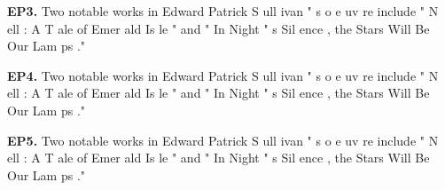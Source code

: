 \begin{mdframed}
\textbf{EP3.} \textcolor{Gray0}{Two} \textcolor{Gray0}{notable} \textcolor{Gray0}{works} \textcolor{Gray0}{in} \textcolor{Gray0}{Edward} \textcolor{Gray0}{Patrick} \textcolor{Gray0}{S} \textcolor{Gray0}{ull} \textcolor{Gray1}{ivan} \textcolor{Gray0}{"} \textcolor{Gray0}{s} \textcolor{Gray0}{o} \textcolor{Gray1}{e} \textcolor{Gray4}{uv} \textcolor{Gray5}{re} \textcolor{Gray0}{include} \textcolor{Gray0}{"} \textcolor{Gray0}{N} \textcolor{Gray2}{ell} \textcolor{Gray0}{:} \textcolor{Gray0}{A} \textcolor{Gray0}{T} \textcolor{Gray0}{ale} \textcolor{Gray0}{of} \textcolor{Gray0}{Emer} \textcolor{Gray3}{ald} \textcolor{Gray0}{Is} \textcolor{Gray8}{le} \textcolor{Gray0}{"} \textcolor{Gray1}{and} \textcolor{Gray0}{"} \textcolor{Gray0}{In} \textcolor{Gray0}{Night} \textcolor{Gray0}{"} \textcolor{Gray2}{s} \textcolor{Gray3}{Sil} \textcolor{Gray4}{ence} \textcolor{Gray1}{,} \textcolor{Gray2}{the} \textcolor{Gray2}{Stars} \textcolor{Gray3}{Will} \textcolor{Gray1}{Be} \textcolor{Gray0}{Our} \textcolor{Gray7}{Lam} \textcolor{Gray6}{ps} \textcolor{Gray0}{."} 

\textbf{EP4.} \textcolor{Gray0}{Two} \textcolor{Gray0}{notable} \textcolor{Gray0}{works} \textcolor{Gray0}{in} \textcolor{Gray0}{Edward} \textcolor{Gray0}{Patrick} \textcolor{Gray0}{S} \textcolor{Gray0}{ull} \textcolor{Gray0}{ivan} \textcolor{Gray0}{"} \textcolor{Gray0}{s} \textcolor{Gray0}{o} \textcolor{Gray0}{e} \textcolor{Gray0}{uv} \textcolor{Gray0}{re} \textcolor{Gray0}{include} \textcolor{Gray0}{"} \textcolor{Gray0}{N} \textcolor{Gray0}{ell} \textcolor{Gray0}{:} \textcolor{Gray0}{A} \textcolor{Gray0}{T} \textcolor{Gray0}{ale} \textcolor{Gray0}{of} \textcolor{Gray0}{Emer} \textcolor{Gray0}{ald} \textcolor{Gray0}{Is} \textcolor{Gray0}{le} \textcolor{Gray0}{"} \textcolor{Gray0}{and} \textcolor{Gray0}{"} \textcolor{Gray0}{In} \textcolor{Gray0}{Night} \textcolor{Gray0}{"} \textcolor{Gray0}{s} \textcolor{Gray0}{Sil} \textcolor{Gray0}{ence} \textcolor{Gray0}{,} \textcolor{Gray0}{the} \textcolor{Gray0}{Stars} \textcolor{Gray0}{Will} \textcolor{Gray0}{Be} \textcolor{Gray0}{Our} \textcolor{Gray0}{Lam} \textcolor{Gray0}{ps} \textcolor{Gray0}{."} 

\textbf{EP5.} \textcolor{Gray0}{Two} \textcolor{Gray0}{notable} \textcolor{Gray0}{works} \textcolor{Gray0}{in} \textcolor{Gray0}{Edward} \textcolor{Gray0}{Patrick} \textcolor{Gray0}{S} \textcolor{Gray0}{ull} \textcolor{Gray0}{ivan} \textcolor{Gray0}{"} \textcolor{Gray0}{s} \textcolor{Gray0}{o} \textcolor{Gray0}{e} \textcolor{Gray0}{uv} \textcolor{Gray0}{re} \textcolor{Gray0}{include} \textcolor{Gray0}{"} \textcolor{Gray0}{N} \textcolor{Gray0}{ell} \textcolor{Gray0}{:} \textcolor{Gray0}{A} \textcolor{Gray0}{T} \textcolor{Gray0}{ale} \textcolor{Gray0}{of} \textcolor{Gray0}{Emer} \textcolor{Gray0}{ald} \textcolor{Gray0}{Is} \textcolor{Gray0}{le} \textcolor{Gray0}{"} \textcolor{Gray0}{and} \textcolor{Gray0}{"} \textcolor{Gray0}{In} \textcolor{Gray0}{Night} \textcolor{Gray0}{"} \textcolor{Gray0}{s} \textcolor{Gray0}{Sil} \textcolor{Gray0}{ence} \textcolor{Gray0}{,} \textcolor{Gray0}{the} \textcolor{Gray0}{Stars} \textcolor{Gray0}{Will} \textcolor{Gray0}{Be} \textcolor{Gray0}{Our} \textcolor{Gray0}{Lam} \textcolor{Gray0}{ps} \textcolor{Gray0}{."}

\end{mdframed}
